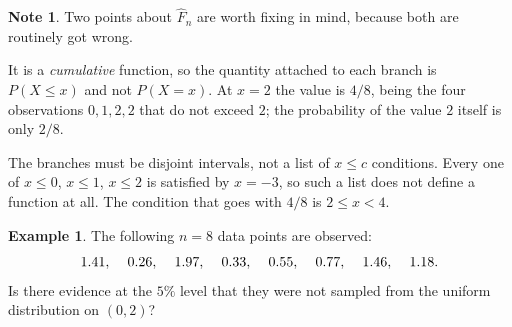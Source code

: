 \documentclass[11pt,a4paper]{article}
\theoremstyle{definition}
\newtheorem{example}[thm]{Example}
\newtheorem{note}[thm]{Note}
\begin{document}
\begin{note}
Two points about $\widehat{F}_n$ are worth fixing in mind, because both are
routinely got wrong.

It is a \emph{cumulative} function, so the quantity attached to each branch is
$P\left(X\leq x\right)$ and not $P(X=x)$. At $x=2$ the value is $4/8$, being the
four observations $0,1,2,2$ that do not exceed $2$; the probability of the value
$2$ itself is only $2/8$.

The branches must be disjoint intervals, not a list of $x\leq c$ conditions. Every
one of $x\leq 0$, $x\leq 1$, $x\leq 2$ is satisfied by $x=-3$, so such a list does
not define a function at all. The condition that goes with $4/8$ is $2\leq x<4$.
\end{note}


\begin{example}
The following $n=8$ data points are observed:
$$1.41,\hspace{0.4cm}0.26,\hspace{0.4cm}1.97,\hspace{0.4cm}0.33,\hspace{0.4cm}
0.55,\hspace{0.4cm}0.77,\hspace{0.4cm}1.46,\hspace{0.4cm}1.18 .$$
Is there evidence at the $5\%$ level that they were not sampled from the uniform
distribution on $(0,2)$?
\end{example}
\end{document}

